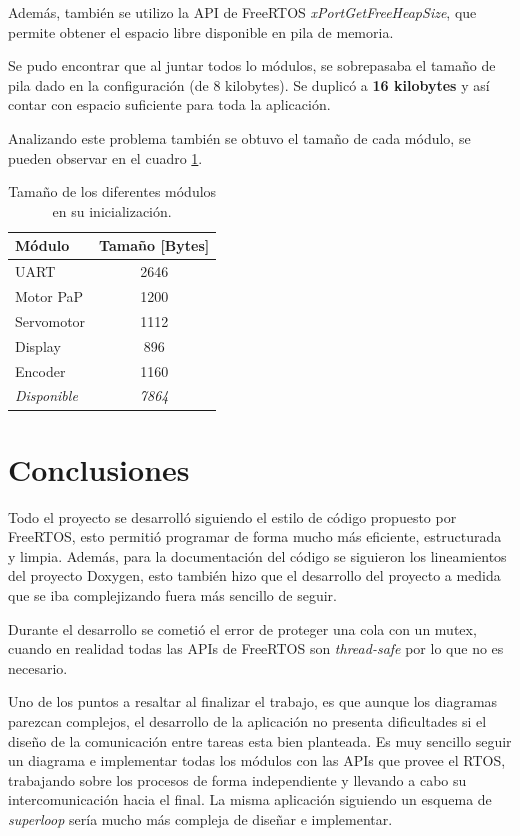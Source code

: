 \documentclass{IEEEtran}
\begin{document}
Además, también se utilizo la API de FreeRTOS \textit{xPortGetFreeHeapSize}, que permite obtener el espacio libre disponible en pila de memoria.

Se pudo encontrar que al juntar todos lo módulos, se sobrepasaba el tamaño de pila dado en la configuración (de 8 kilobytes). Se duplicó a \textbf{16 kilobytes} y así contar con espacio suficiente para toda la aplicación.

Analizando este problema también se obtuvo el tamaño de cada módulo, se pueden observar en el cuadro \ref{tabla:size-modulos}.

\begin{table}[ht]
    \centering
    \begin{tabular}{|l|c|}
    \hline
    \textbf{Módulo} & \textbf{Tamaño {[}Bytes{]}} \\ \hline
    UART & 2646 \\ \hline
    Motor PaP & 1200 \\ \hline
    Servomotor & 1112 \\ \hline
    Display & 896 \\ \hline
    Encoder & 1160 \\ \hline
    \textit{Disponible} & \textit{7864} \\ \hline
    \end{tabular}
    \caption{Tamaño de los diferentes módulos en su inicialización.}
    \label{tabla:size-modulos}
\end{table}

\section{Conclusiones}
\label{sec:conclusiones}
Todo el proyecto se desarrolló siguiendo el estilo de código propuesto por FreeRTOS, esto permitió programar de forma mucho más eficiente, estructurada y limpia. Además, para la documentación del código se siguieron los lineamientos del proyecto Doxygen, esto también hizo que el desarrollo del proyecto a medida que se iba complejizando fuera más sencillo de seguir.

Durante el desarrollo se cometió el error de proteger una cola con un mutex, cuando en realidad todas las APIs de FreeRTOS son \textit{thread-safe} por lo que no es necesario.

Uno de los puntos a resaltar al finalizar el trabajo, es que aunque los diagramas parezcan complejos, el desarrollo de la aplicación no presenta dificultades si el diseño de la comunicación entre tareas esta bien planteada. Es muy sencillo seguir un diagrama e implementar todas los módulos con las APIs que provee el RTOS, trabajando sobre los procesos de forma independiente y llevando a cabo su intercomunicación hacia el final. La misma aplicación siguiendo un esquema de \textit{superloop} sería mucho más compleja de diseñar e implementar.
\end{document}
